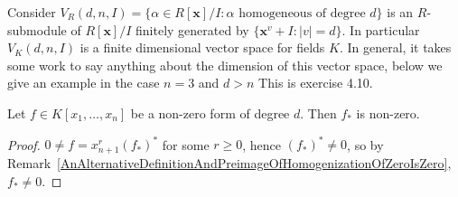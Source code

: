 \begin{remark}\label{VectorSpaceOfForms}
    Consider $V_R(d,n,I)=\{ \alpha \in R[\mathbf{x}]/I : \alpha \text{ homogeneous of degree } d\}$ is an $R$-submodule of $R[\mathbf{x}]/I$ finitely generated by $\{\mathbf{x}^v + I:\vert v\vert =d\}.$ In particular $V_K(d,n,I)$ is a finite dimensional vector space for fields $K$. In general, it takes some work to say anything about the dimension of this vector space, below we give an example in the case $n=3$ and $d>n$ {\Large This is exercise 4.10}. 
\end{remark}
\begin{example}
    
\end{example}
\begin{lemma}\label{TechnicalLemmaForNoetherLemma}
    Let $f\in K[x_1,\dots,x_n]$ be a non-zero form of degree $d$. Then $f_\ast$ is non-zero.
\end{lemma}
\begin{proof}
    $0\neq f = x_{n+1}^r(f_\ast)^\ast$ for some $r\geq 0$, hence $(f_\ast)^\ast \neq 0$, so by Remark~\ref{AnAlternativeDefinitionAndPreimageOfHomogenizationOfZeroIsZero}, $f_\ast \neq 0$.     
\end{proof}
